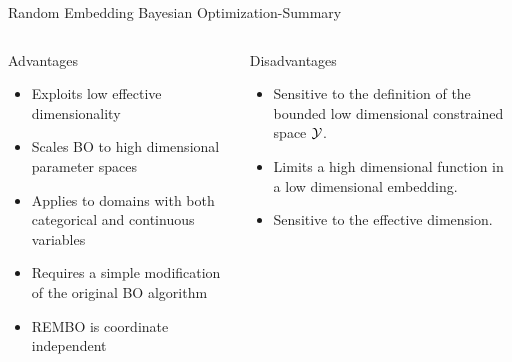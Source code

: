 \begin{frame}{Random Embedding Bayesian Optimization-Summary}
\begin{columns}[T] %
\begin{column}{.48\textwidth}


    \begin{block}{Advantages}
    \begin{itemize}
    	\item Exploits low effective dimensionality 
    	\pause
    	\item Scales BO to high dimensional parameter spaces 
    	\pause
    	\item Applies to domains with both categorical and continuous variables
    	\pause
    	\item Requires a simple modification of the original BO algorithm
    	\pause
    	\item REMBO is coordinate independent
    \end{itemize}
    \end{block}
\pause
\end{column}%

\hfill%

\begin{column}{.48\textwidth}

    \begin{block}{Disadvantages}
    \begin{itemize}
    	\item Sensitive to the definition of the bounded low dimensional constrained space $\mathcal{Y}$.
    	\pause
    	\item Limits a high dimensional function in a low dimensional embedding.
    	\pause
    	\item Sensitive to the effective dimension.
    \end{itemize}
\end{block}

\end{column}
\end{columns}   
\end{frame}

